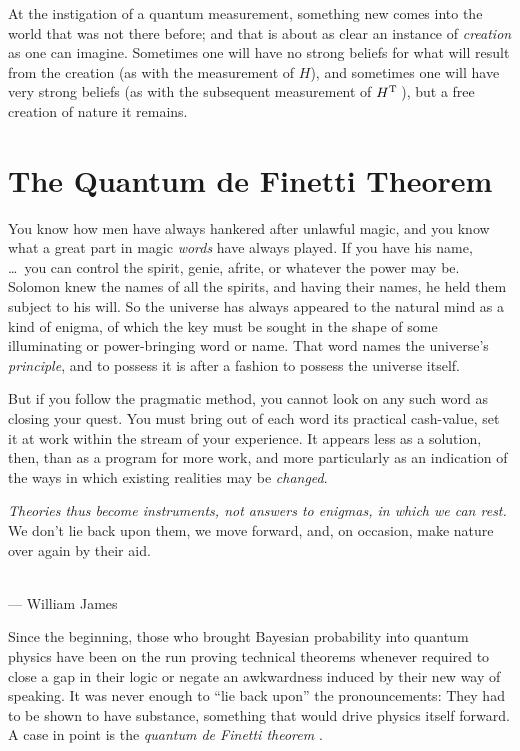 \documentclass[aps,pra,superscriptaddress,12pt,tightenlines,nofootinbib]{revtex4-2}
\begin{document}
At the instigation of a quantum measurement, something new comes into the world that was not there before; and that is about as clear an instance of {\it creation\/} as one can imagine.  Sometimes one will have no strong beliefs for what will result from the creation (as with the measurement of $H$), and sometimes one will have very strong beliefs (as with the subsequent measurement of $H^{\rm T}\,$), but a free creation of nature it remains.

\vfill

\section{The Quantum de Finetti Theorem}

\begin{flushright}
\baselineskip=13pt
\parbox{2.8in}{\baselineskip=13pt\footnotesize

You know how men have always hankered after unlawful magic, and you know
what a great part in magic {\it words\/} have always played. If you
have his name, \ldots\ you can
control the spirit, genie, afrite, or whatever the power may be.
Solomon knew the names of all the spirits, and having their names, he
held them subject to his will.  So the universe has always appeared
to the natural mind as a kind of enigma, of which the key must be
sought in the shape of some illuminating or power-bringing word or
name.  That word names the universe's {\it principle}, and to possess
it is after a fashion to possess the universe itself.\medskip

But if you follow the pragmatic method, you cannot look on any such
word as closing your quest.  You must bring out of each word its
practical cash-value, set it at work within the stream of your
experience.  It appears less as a solution, then, than as a program
for more work, and more particularly as an indication of the ways in
which existing realities may be {\it changed}.\medskip

{\it Theories thus become instruments, not answers to enigmas, in
which we can rest.}  We don't lie back upon them, we move forward,
and, on occasion, make nature over again by their aid.}
\medskip\\
 --- William James
\end{flushright}

Since the beginning, those who brought Bayesian probability into quantum physics have been on the run proving technical theorems whenever required to close a gap in their logic or negate an awkwardness induced by their new way of speaking.  It was never enough to ``lie back upon'' the pronouncements:  They had to be shown to have substance, something that would drive physics itself forward.  A case in point is the {\it quantum de Finetti theorem} \cite{Fuchs04,Caves02b}.
\end{document}
